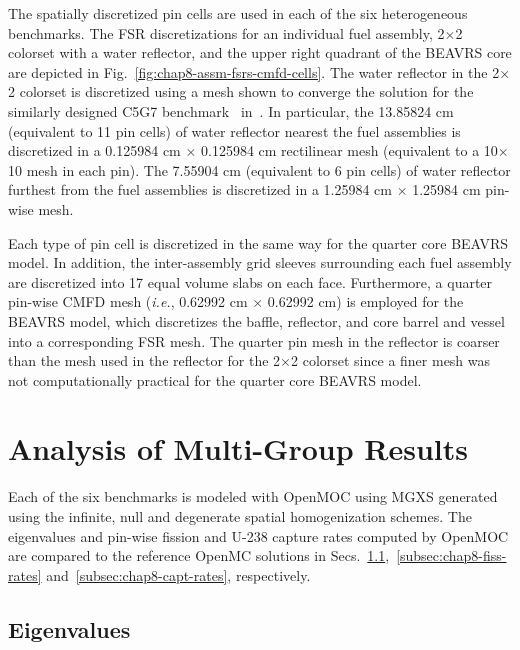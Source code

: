 The spatially discretized pin cells are used in each of the six heterogeneous benchmarks. The \ac{FSR} discretizations for an individual fuel assembly, 2$\times$2 colorset with a water reflector, and the upper right quadrant of the \ac{BEAVRS} core are depicted in Fig.~\ref{fig:chap8-assm-fsrs-cmfd-cells}. The water reflector in the 2$\times$2 colorset is discretized using a mesh shown to converge the solution for the similarly designed C5G7 benchmark~\cite{lewis2003c5g7} in~\cite{boyd2014ms}. In particular, the 13.85824 cm (equivalent to 11 pin cells) of water reflector nearest the fuel assemblies is discretized in a 0.125984 cm $\times$ 0.125984 cm rectilinear mesh (equivalent to a 10$\times$10 mesh in each pin). The 7.55904 cm (equivalent to 6 pin cells) of water reflector furthest from the fuel assemblies is discretized in a 1.25984 cm $\times$ 1.25984 cm pin-wise mesh.

Each type of pin cell is discretized in the same way for the quarter core \ac{BEAVRS} model. In addition, the inter-assembly grid sleeves surrounding each fuel assembly are discretized into 17 equal volume slabs on each face. Furthermore, a quarter pin-wise \ac{CMFD} mesh (\textit{i.e.}, 0.62992 cm $\times$ 0.62992 cm) is employed for the \ac{BEAVRS} model, which discretizes the baffle, reflector, and core barrel and vessel into a corresponding \ac{FSR} mesh. The quarter pin mesh in the reflector is coarser than the mesh used in the reflector for the 2$\times$2 colorset since a finer mesh was not computationally practical for the quarter core \ac{BEAVRS} model.


\section{Analysis of Multi-Group Results}
\label{sec:chap8-mg-results}

Each of the six benchmarks is modeled with OpenMOC using \ac{MGXS} generated using the infinite, null and degenerate spatial homogenization schemes. The eigenvalues and pin-wise fission and U-238 capture rates computed by OpenMOC are compared to the reference OpenMC solutions in Secs.~\ref{subsec:chap8-eigenvalues},~\ref{subsec:chap8-fiss-rates} and~\ref{subsec:chap8-capt-rates}, respectively.

\subsection{Eigenvalues}
\label{subsec:chap8-eigenvalues}

